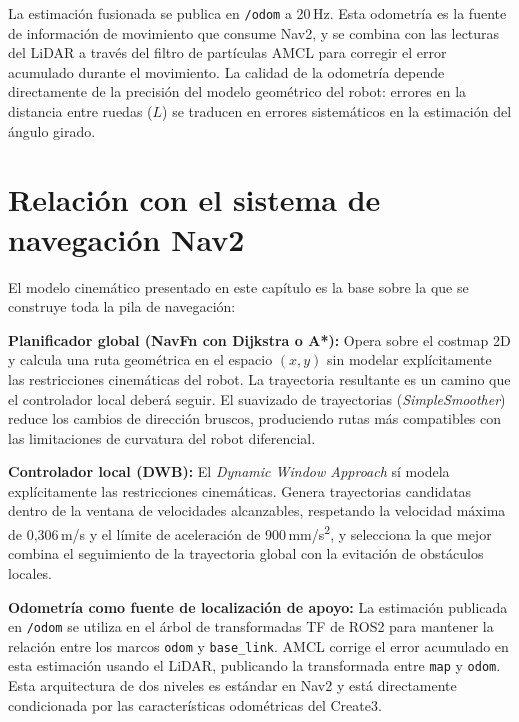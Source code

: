 La estimación fusionada se publica en \texttt{/odom} a 20\,Hz. Esta odometría es la fuente de información de movimiento que consume Nav2, y se combina con las lecturas del LiDAR a través del filtro de partículas AMCL para corregir el error acumulado durante el movimiento. La calidad de la odometría depende directamente de la precisión del modelo geométrico del robot: errores en la distancia entre ruedas ($L$) se traducen en errores sistemáticos en la estimación del ángulo girado.

\section{Relación con el sistema de navegación Nav2}

El modelo cinemático presentado en este capítulo es la base sobre la que se construye toda la pila de navegación:

\textbf{Planificador global (NavFn con Dijkstra o A*):} Opera sobre el costmap 2D y calcula una ruta geométrica en el espacio $(x, y)$ sin modelar explícitamente las restricciones cinemáticas del robot. La trayectoria resultante es un camino que el controlador local deberá seguir. El suavizado de trayectorias (\textit{SimpleSmoother}) reduce los cambios de dirección bruscos, produciendo rutas más compatibles con las limitaciones de curvatura del robot diferencial.

\textbf{Controlador local (DWB):} El \textit{Dynamic Window Approach} sí modela explícitamente las restricciones cinemáticas. Genera trayectorias candidatas dentro de la ventana de velocidades alcanzables, respetando la velocidad máxima de 0,306\,m/s y el límite de aceleración de 900\,mm/s\textsuperscript{2}, y selecciona la que mejor combina el seguimiento de la trayectoria global con la evitación de obstáculos locales.

\textbf{Odometría como fuente de localización de apoyo:} La estimación publicada en \texttt{/odom} se utiliza en el árbol de transformadas TF de ROS2 para mantener la relación entre los marcos \texttt{odom} y \texttt{base\_link}. AMCL corrige el error acumulado en esta estimación usando el LiDAR, publicando la transformada entre \texttt{map} y \texttt{odom}. Esta arquitectura de dos niveles es estándar en Nav2 y está directamente condicionada por las características odométricas del Create3.
